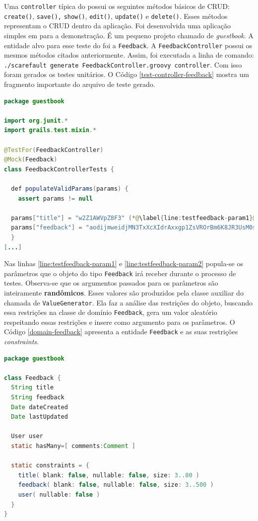 Uma \lstinline|controller| típica do \grails possui os seguintes métodos básicos de CRUD:
\lstinline|create()|, \lstinline|save(),| \lstinline|show()|, \lstinline|edit()|,
\lstinline|update()| e \lstinline|delete()|. Esses métodos representam
o CRUD dentro da aplicação. Foi desenvolvida uma aplicação simples em
\grails para a demonstração. É um pequeno projeto chamado de \textit{guestbook}.
A entidade alvo para esse teste do \framework foi a \lstinline|Feedback|.
A \lstinline|FeedbackController| possui os mesmos métodos citados anteriormente.
Assim, foi executada a linha de comando:
\lstinline|./scarefault generate FeedbackController.groovy controller|. Com isso
foram gerados os testes unitários. O Código \ref{test-controller-feedback}
mostra um fragmento importante do arquivo de teste gerado.
\begin{lstlisting}[language=java, label=test-controller-feedback, caption=Fragmento do arquivo de teste gerado para a \lstinline|FeedbackController|]
package guestbook

import org.junit.*
import grails.test.mixin.*

@TestFor(FeedbackController)
@Mock(Feedback)
class FeedbackControllerTests {

  def populateValidParams(params) {
    assert params != null

  params["title"] = "w2Z1AWVpZ8F3" (*@\label{line:testfeedback-param1}@*)
  params["feedback"] = "aodijmweidjMN3TxXcXIdrAxxgp1ZsVROrBm6K8JR3UsM0stcSFINRHL87O" (*@\label{line:testfeedback-param2}@*)
  }
[...]  
\end{lstlisting}

Nas linhas \ref{line:testfeedback-param1} e \ref{line:testfeedback-param2}
popula-se os parâmetros que o objeto do tipo \lstinline|Feedback| 
irá receber durante o processo de testes. Observa-se que os argumentos 
passados para os parâmetros são inteiramente \textbf{randômicos}.
Esses valores são produzidos pela classe auxiliar do \framework chamada
de \lstinline|ValueGenerator|. Ela faz a análise das restrições do objeto,
buscando essa restrições na classe de domínio \lstinline|Feedback|, gera
um valor aleatório respeitando essas restrições e insere como argumento
para os parâmetros. O Código \ref{domain-feedback} apresenta a entidade
\lstinline|Feedback| e as suas restrições \textit{constraints}.

\begin{lstlisting}[language=java, label=domain-feedback, caption=Arquivo de \lstinline|Feedback|]
package guestbook

class Feedback {
  String title
  String feedback
  Date dateCreated
  Date lastUpdated

  User user
  static hasMany=[ comments:Comment ]

  static constraints = {
    title( blank: false, nullable: false, size: 3..80 )
    feedback( blank: false, nullable: false, size: 3..500 )
    user( nullable: false )
  }
}

\end{lstlisting}


